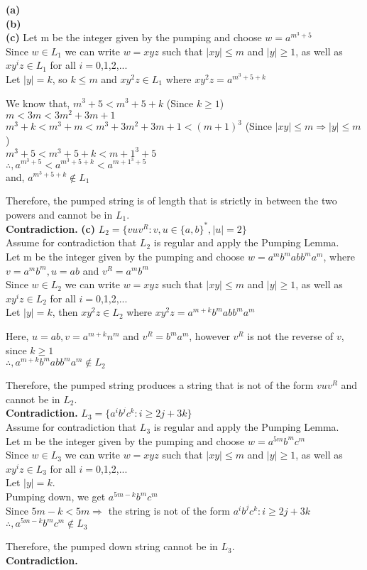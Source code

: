 \documentclass{homework}
\begin{document}
\maketitle
\question
\textbf{(a)}\\
\textbf{(b)}\\
\textbf{(c)}
Let m be the integer given by the pumping and choose $w=a^{m^3+5}$ \\
Since $w \in L_1$ we can write $w = xyz$ such that $|xy| \leq m$ and $|y| \geq 1$, as well as $xy^iz \in L_1$ for all $i=$0,1,2,...\\
Let $|y|=k$, so $k \leq m$ and $xy^2z \in L_1$ where $xy^2z=a^{m^3+5+k}$ 

We know that, $m^3+5<m^3+5+k$ (Since $k \geq 1$)\\
$m<3m<3m^2+3m+1$\\
$m^3+k<m^3+m<m^3+3m^2+3m+1<(m+1)^3$ (Since $|xy| \leq m \Rightarrow |y| \leq m $)\\
$m^3+5<m^3+5+k<{m+1}^3+5$\\
$\therefore, a^{m^3+5}<a^{m^3+5+k}<a^{{m+1}^3+5}$\\
and, $a^{m^3+5+k} \not\in L_1$

Therefore, the pumped string is of length that is strictly in between the two powers and cannot be in $L_1$. \\
\textbf{Contradiction.}
\textbf{(c)}
\question
$L_2=\{vuv^R : v,u \in \{a,b\}^*, |u|=2\}$\\
Assume for contradiction that $L_2$ is regular and apply the Pumping Lemma. \\
Let m be the integer given by the pumping and choose $w=a^mb^mabb^ma^m$, where $v=a^mb^m, u=ab$ and $ v^R=a^mb^m$ \\
Since $w \in L_2$ we can write $w = xyz$ such that $|xy| \leq m$ and $|y| \geq 1$, as well as $xy^iz \in L_2$ for all $i=$0,1,2,...\\
Let $|y|=k$, then $xy^2z \in L_2$ where $xy^2z=a^{m+k}b^mabb^ma^m$ 

Here, $u=ab, v=a^{m+k}n^m$ and $v^R=b^ma^m$, however $v^R$ is not the reverse of $v$, since $k \geq 1$\\
$\therefore, a^{m+k}b^mabb^ma^m \not\in L_2$

Therefore, the pumped string produces a string that is not of the form $vuv^R$ and cannot be in $L_2$. \\
\textbf{Contradiction.}
\question
$L_3=\{a^ib^jc^k : i \geq 2j+3k\}$\\
Assume for contradiction that $L_3$ is regular and apply the Pumping Lemma. \\
Let m be the integer given by the pumping and choose $w=a^{5m}b^mc^m$ \\
Since $w \in L_3$ we can write $w = xyz$ such that $|xy| \leq m$ and $|y| \geq 1$, as well as $xy^iz \in L_3$ for all $i=$0,1,2,...\\
Let $|y|=k$.\\
Pumping down, we get $a^{5m-k}b^mc^m$\\
Since $5m-k<5m \Rightarrow$ the string is not of the form $a^ib^jc^k : i \geq 2j+3k$\\ 
$\therefore, a^{5m-k}b^mc^m \not \in L_3$

Therefore, the pumped down string cannot be in $L_3$. \\
\textbf{Contradiction.}
\end{document}
